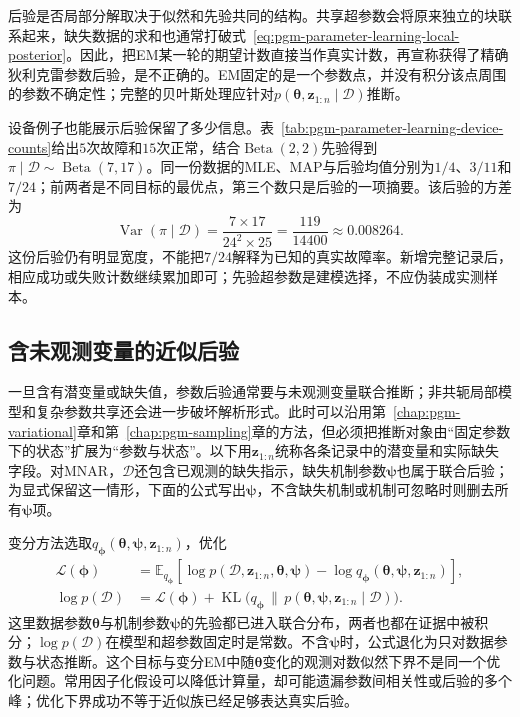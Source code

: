 后验是否局部分解取决于似然和先验共同的结构。共享超参数会将原来独立的块联系起来，缺失数据的求和也通常打破式~\eqref{eq:pgm-parameter-learning-local-posterior}。因此，把EM某一轮的期望计数直接当作真实计数，再宣称获得了精确狄利克雷参数后验，是不正确的。EM固定的是一个参数点，并没有积分该点周围的参数不确定性；完整的贝叶斯处理应针对$p(\bm{\theta},\bm{z}_{1:n}\mid\mathcal{D})$推断。

设备例子也能展示后验保留了多少信息。表~\ref{tab:pgm-parameter-learning-device-counts}给出$5$次故障和$15$次正常，结合$\operatorname{Beta}(2,2)$先验得到$\pi\mid\mathcal{D}\sim\operatorname{Beta}(7,17)$。同一份数据的MLE、MAP与后验均值分别为$1/4$、$3/11$和$7/24$；前两者是不同目标的最优点，第三个数只是后验的一项摘要。该后验的方差为
\[
  \operatorname{Var}(\pi\mid\mathcal{D})
   =\frac{7\times17}{24^2\times25}
   =\frac{119}{14400}\approx0.008264.
\]
这份后验仍有明显宽度，不能把$7/24$解释为已知的真实故障率。新增完整记录后，相应成功或失败计数继续累加即可；先验超参数是建模选择，不应伪装成实测样本。

\subsection{含未观测变量的近似后验}
\label{sec:pgm-parameter-learning-approximate-posterior}

一旦含有潜变量或缺失值，参数后验通常要与未观测变量联合推断；非共轭局部模型和复杂参数共享还会进一步破坏解析形式。此时可以沿用第~\ref{chap:pgm-variational}章和第~\ref{chap:pgm-sampling}章的方法，但必须把推断对象由“固定参数下的状态”扩展为“参数与状态”。以下用$\bm{z}_{1:n}$统称各条记录中的潜变量和实际缺失字段。对MNAR，$\mathcal{D}$还包含已观测的缺失指示，缺失机制参数$\bm{\psi}$也属于联合后验；为显式保留这一情形，下面的公式写出$\bm{\psi}$，不含缺失机制或机制可忽略时则删去所有$\bm{\psi}$项。

变分方法选取$q_{\bm{\phi}}(\bm{\theta},\bm{\psi},\bm{z}_{1:n})$，优化
\begin{equation}
  \begin{aligned}
    \mathcal{L}(\bm{\phi})
      &=\mathbb{E}_{q_{\bm{\phi}}}
       [\log p(\mathcal{D},\bm{z}_{1:n},\bm{\theta},\bm{\psi})
        -\log q_{\bm{\phi}}
          (\bm{\theta},\bm{\psi},\bm{z}_{1:n})],\\
    \log p(\mathcal{D})
      &=\mathcal{L}(\bm{\phi})
        +\operatorname{KL}\bigl(
          q_{\bm{\phi}}\,\|\,
          p(\bm{\theta},\bm{\psi},\bm{z}_{1:n}\mid\mathcal{D})
        \bigr).
  \end{aligned}
  \label{eq:pgm-parameter-learning-bayesian-elbo}
\end{equation}
这里数据参数$\bm{\theta}$与机制参数$\bm{\psi}$的先验都已进入联合分布，两者也都在证据中被积分；$\log p(\mathcal{D})$在模型和超参数固定时是常数。不含$\bm{\psi}$时，公式退化为只对数据参数与状态推断。这个目标与变分EM中随$\bm{\theta}$变化的观测对数似然下界不是同一个优化问题。常用因子化假设可以降低计算量，却可能遗漏参数间相关性或后验的多个峰；优化下界成功不等于近似族已经足够表达真实后验。

